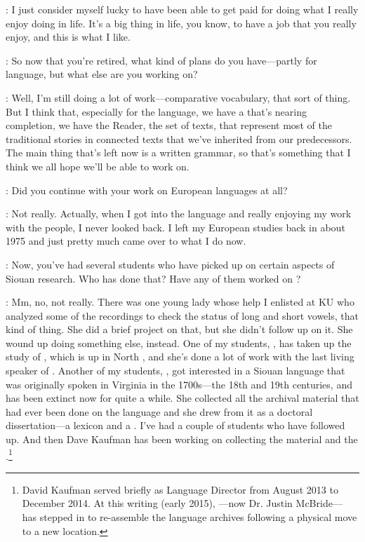 \documentclass[output=paper]{LSP/langsci}
\begin{document}
: I just consider myself lucky to have been able to get paid for doing what I really enjoy doing in life. It's a big thing in life, you know, to have a job that you really enjoy, and this is what I like.

: So now that you're retired, what kind of plans do you have---partly for  language, but what else are you working on?

: Well, I'm still doing a lot of work---comparative vocabulary, that sort of thing. But I think that, especially for the  language, we have a  that's nearing completion, we have the Reader, the set of  texts, that represent most of the traditional stories in connected texts that we've inherited from our predecessors. The main thing that's left now is a written grammar, so that's something that I think we all hope we'll be able to work on.

: Did you continue with your work on European languages at all?

: Not really. Actually, when I got into the  language and really enjoying my work with the  people, I never looked back. I left my European studies back in about 1975 and just pretty much came over to what I do now.

: Now, you've had several students who have picked up on certain aspects of Siouan research. Who has done that? Have any of them worked on ?

: Mm, no, not really. There was one young lady whose help I enlisted at KU who analyzed some of the recordings to check the status of long and short vowels, that kind of thing. She did a brief project on that, but she didn't follow up on it. She wound up doing something else, instead. One of my students, , has taken up the study of , which is up in North , and she's done a lot of work with the last living speaker of . Another of my students, , got interested in a Siouan language that was originally spoken in Virginia in the 1700s---the 18th and 19th centuries, and has been extinct now for quite a while. She collected all the archival material that had ever been done on the  language and she drew from it as a doctoral dissertation---a lexicon and a . I've had a couple of students who have followed up. And then Dave Kaufman has been working on collecting the  material and the  .\footnote{David Kaufman served briefly as  Language Director from August 2013 to December 2014. At this writing (early 2015),  ---now Dr. Justin McBride--- has stepped in to re-assemble the  language archives following a physical move to a new location.}
\end{document}
